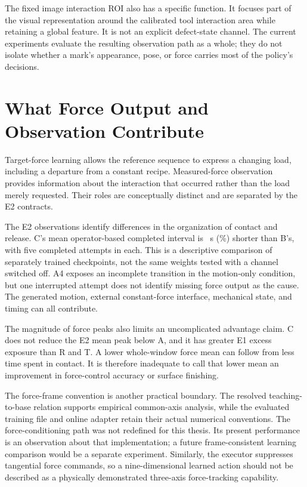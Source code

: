 The fixed image interaction ROI also has a specific function. It focuses part of the visual representation around the calibrated tool interaction area while retaining a global feature. It is not an explicit defect-state channel. The current experiments evaluate the resulting observation path as a whole; they do not isolate whether a mark's appearance, pose, or force carries most of the policy's decisions.

\section{What Force Output and Observation Contribute}
Target-force learning allows the reference sequence to express a changing load, including a departure from a constant recipe. Measured-force observation provides information about the interaction that occurred rather than the load merely requested. Their roles are conceptually distinct and are separated by the E2 contracts.

The E2 observations identify differences in the organization of contact and release. C's mean operator-based completed interval is \BCSeconds~s (\BCPercent\%) shorter than B's, with five completed attempts in each. This is a descriptive comparison of separately trained checkpoints, not the same weights tested with a channel switched off. A4 exposes an incomplete transition in the motion-only condition, but one interrupted attempt does not identify missing force output as the cause. The generated motion, external constant-force interface, mechanical state, and timing can all contribute.

The magnitude of force peaks also limits an uncomplicated advantage claim. C does not reduce the E2 mean peak below A, and it has greater E1 excess exposure than R and T. A lower whole-window force mean can follow from less time spent in contact. It is therefore inadequate to call that lower mean an improvement in force-control accuracy or surface finishing.

The force-frame convention is another practical boundary. The resolved teaching-to-base relation supports empirical common-axis analysis, while the evaluated training file and online adapter retain their actual numerical conventions. The force-conditioning path was not redefined for this thesis. Its present performance is an observation about that implementation; a future frame-consistent learning comparison would be a separate experiment. Similarly, the executor suppresses tangential force commands, so a nine-dimensional learned action should not be described as a physically demonstrated three-axis force-tracking capability.

